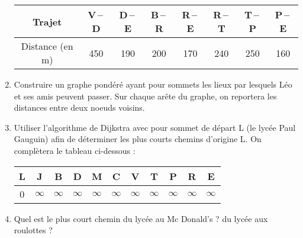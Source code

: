 \documentclass[a4paper]{article}
\begin{document}
\begin{enumerate}
    \begin{center}
      \begin{tabular}{@{}cccccccc@{}}
	\toprule
	Trajet & V\,--\,D & D\,--\,E & B\,--\,R & R\,--\,E & R\,--\,T & T\,--\,P & P\,--\,E\\
	\midrule
	Distance (en m) & 450 & 190 & 200 & 170 & 240 & 250 & 160\\
	\bottomrule
      \end{tabular}
    \end{center}

    \smallskip

  \item Construire un graphe pondéré ayant pour sommets les lieux par lesquels Léo et ses amis peuvent passer. Sur chaque arête du graphe, on reportera les distances entre deux noeuds voisins.
  \item Utiliser l'algorithme de Dijkstra avec pour sommet de départ L (le lycée Paul Gauguin) afin de déterminer les plus courts chemins d'origine L. On complètera le tableau ci-dessous :
    \begin{center}
      \begin{tabular}{@{}ccccccccccc@{}}
	\toprule
	L & J & B & D & M & C & V & T & P & R & E\\
	\midrule
	0 & $\infty$ & $\infty$ & $\infty$ & $\infty$ & $\infty$ & $\infty$ & $\infty$ & $\infty$ & $\infty$ & $\infty$\\
	\bottomrule
      \end{tabular}
    \end{center}
  \item Quel est le plus court chemin du lycée au Mc Donald's ? du lycée aux roulottes ?
\end{enumerate}
  
\end{document}
